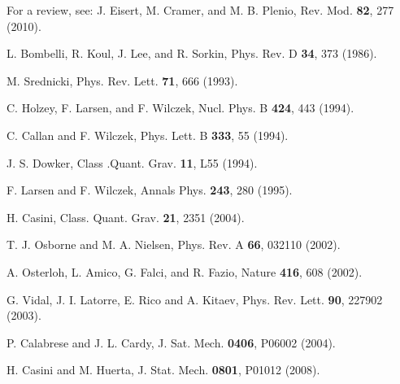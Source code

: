 \documentclass[aps,showpacs,showkeys]{revtex4}
\begin{document}
\begin{thebibliography}{0}

For a review, see: 
J. Eisert, M. Cramer, and M. B. Plenio, Rev. Mod. {\bf 82}, 277 (2010). 

L. Bombelli, R. Koul, J. Lee, and R. Sorkin, Phys. Rev. D {\bf 34}, 373 (1986).

M. Srednicki, Phys. Rev. Lett. {\bf 71}, 666 (1993).

C. Holzey, F. Larsen, and F. Wilczek, Nucl. Phys. B {\bf 424}, 443 (1994).

C. Callan and F. Wilczek, Phys. Lett. B {\bf 333}, 55 (1994).

J. S. Dowker, Class .Quant. Grav. {\bf 11}, L55 (1994).

F. Larsen and F. Wilczek, Annals Phys. {\bf 243}, 280 (1995).

H. Casini, Class. Quant. Grav. {\bf 21}, 2351 (2004).

T. J. Osborne and M. A. Nielsen, Phys. Rev. A {\bf 66}, 032110 (2002). 

A. Osterloh, L. Amico, G. Falci, and R. Fazio, Nature {\bf 416}, 608 (2002). 

G. Vidal, J. I. Latorre, E. Rico and A. Kitaev, Phys. Rev. Lett. {\bf 90}, 227902 (2003).

P. Calabrese and J. L. Cardy, J. Sat. Mech. {\bf 0406}, P06002 (2004).

H. Casini and M. Huerta, J. Stat. Mech. {\bf 0801}, P01012 (2008). 


\end{thebibliography}
\end{document}
